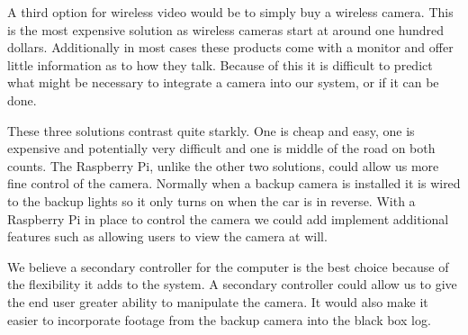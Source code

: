 \documentclass[onecolumn, draftclsnofoot,10pt, compsoc]{IEEEtran}
\begin{document}
A third option for wireless video would be to simply buy a wireless camera. This
is the most expensive solution as wireless cameras start at around one hundred
dollars. Additionally in most cases these products come with a monitor and offer
little information as to how they talk. Because of this it is difficult to
predict what might be necessary to integrate a camera into our system, or if it
can be done.

 These three solutions contrast quite starkly. One is cheap and easy, one is
 expensive and potentially very difficult and one is middle of the road on both
 counts. The Raspberry Pi, unlike the other two solutions, could allow us more
 fine control of the camera. Normally when a backup camera is installed it is
 wired to the backup lights so it only turns on when the car is in reverse. With
 a Raspberry Pi in place to control the camera we could add implement additional
 features such as allowing users to view the camera at will.

 We believe a secondary controller for the computer is the best choice because
 of the flexibility it adds to the system. A secondary controller could allow us
to give the end user greater ability to manipulate the camera. It would also make
it easier to incorporate footage from the backup camera into the black box log.

\nocite{*}


\end{document}
